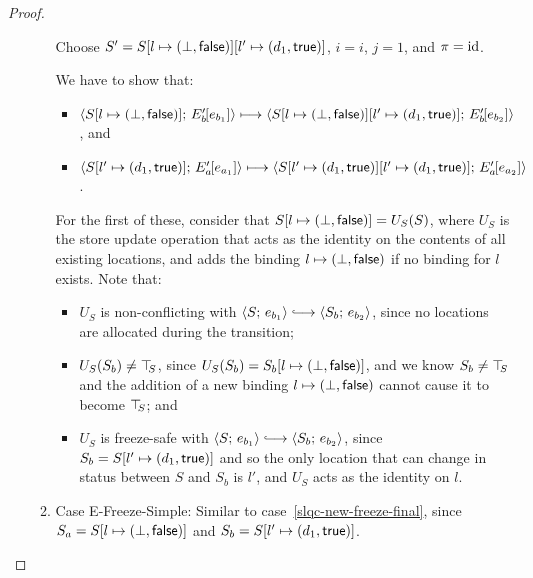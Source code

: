 \begin{proof}
\begin{enumerate}
\begin{enumerate}
      Choose $S' =
      S[l \mapsto (\bot, \textsf{false})][l' \mapsto (d_1, \textsf{true})]$,
      $i = i$, $j = 1$, and $\pi = \mathrm{id}$.

      We have to show that:
      \begin{itemize}
      \item
        $\langle S[l \mapsto (\bot, \textsf{false})];\, E'_b\hspace{-1mm}\left[e_{b_1}\right] \rangle
        \longmapsto
        \langle S[l \mapsto (\bot, \textsf{false})][l' \mapsto (d_1, \textsf{true})];\, E'_b\hspace{-1mm}\left[e_{b_2}\right] \rangle$,
        and
      \item
        $\langle S[l' \mapsto (d_1, \textsf{true})];\, E'_a\hspace{-1mm}\left[e_{a_1}\right] \rangle
        \longmapsto
        \langle S[l' \mapsto (d_1, \textsf{true})][l' \mapsto (d_1, \textsf{true})];\, E'_a\hspace{-1mm}\left[e_{a_2}\right] \rangle$.
      \end{itemize}

      For the first of these, consider that
      $S[l \mapsto (\bot, \textsf{false})] = U_S(S)$, where $U_S$ is the
      store update operation that acts as the identity on the contents
      of all existing locations, and adds the binding
      $l \mapsto (\bot, \textsf{false})$ if no binding for $l$
      exists.  Note that:
      \begin{itemize}
        \item $U_S$ is non-conflicting with $\config{S}{e_{b_1}}
          \parstepsto \config{S_b}{e_{b_2}}$, since no locations are
          allocated during the transition;
        \item $U_S(S_b) \neq \top\hspace{-0.85mm}_{S}$, since $U_S(S_b) =
          S_b[l \mapsto (\bot, \textsf{false})]$, and we know $S_b \neq
          \top\hspace{-0.85mm}_{S}$ and the addition of a new binding
          $l \mapsto (\bot, \textsf{false})$ cannot cause it to
          become $\top\hspace{-0.85mm}_{S}$; and
        \item $U_S$ is freeze-safe with $\config{S}{e_{b_1}}
          \parstepsto \config{S_b}{e_{b_2}}$, since $S_b =
          S[l' \mapsto (d_1, \textsf{true})]$ and so the only location
          that can change in status between $S$ and $S_b$ is $l'$, and
          $U_S$ acts as the identity on $l$.
      \end{itemize}

      \TODO{}

    \item \label{slqc-new-freeze-simple}Case {\sc E-Freeze-Simple}:
      Similar to case~\ref{slqc-new-freeze-final}, since $S_a =
      S[l \mapsto (\bot, \textsf{false})]$ and $S_b =
      S[l' \mapsto (d_1, \textsf{true})]$.


\end{enumerate}
\end{enumerate}
\end{proof}
